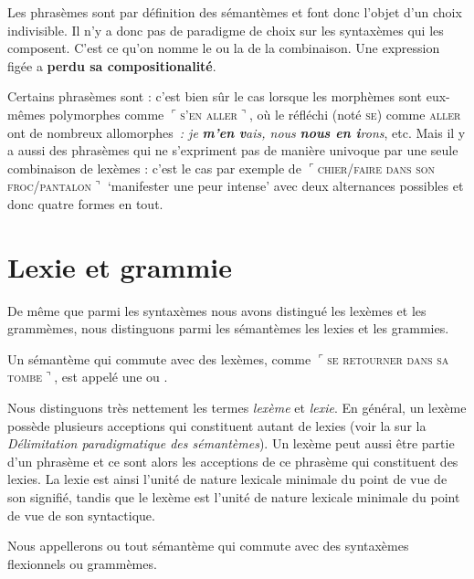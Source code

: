 Les phrasèmes sont par définition des sémantèmes et font donc l’objet d’un choix indivisible. Il n’y a donc pas de paradigme de choix sur les syntaxèmes qui les composent. C’est ce qu’on nomme le  ou la  de la combinaison. Une expression figée a \textbf{perdu sa compositionalité}.

Certains phrasèmes sont : c’est bien sûr le cas lorsque les morphèmes sont eux-mêmes polymorphes comme $⌜$\textsc{s’en} \textsc{aller}$⌝$, où le réfléchi (noté \textsc{se}) comme \textsc{aller} ont de nombreux allomorphes~\textit{: je} \textbf{\textit{m’en} \textit{v}}\textit{ais, nous} \textbf{\textit{nous en i}}\textit{rons}, etc. Mais il y a aussi des phrasèmes qui ne s’expriment pas de manière univoque par une seule combinaison de lexèmes : c’est le cas par exemple de $⌜$\textsc{chier/faire} \textsc{dans} \textsc{son} \textsc{froc/pantalon}$⌝$ ‘manifester une peur intense’ avec deux alternances possibles et donc quatre formes en tout.

\section{Lexie et grammie}\label{sec:2.3.8}

De même que parmi les syntaxèmes nous avons distingué les lexèmes et les grammèmes, nous distinguons parmi les sémantèmes les lexies et les grammies.

{Un sémantème qui commute avec des lexèmes, comme $⌜$\textsc{se} \textsc{retourner} \textsc{dans} \textsc{sa} \textsc{tombe}$⌝$, est appelé une  ou .}

Nous distinguons très nettement les termes \textit{lexème} et \textit{lexie}. En général, un lexème possède plusieurs acceptions qui constituent autant de lexies (voir la  sur la \textit{Délimitation paradigmatique des sémantèmes}). Un lexème peut aussi être partie d’un phrasème et ce sont alors les acceptions de ce phrasème qui constituent des lexies. La lexie est ainsi l’unité de nature lexicale minimale du point de vue de son signifié, tandis que le lexème est l’unité de nature lexicale minimale du point de vue de son syntactique.

{Nous appellerons  ou  tout sémantème qui commute avec des syntaxèmes flexionnels ou grammèmes.}

